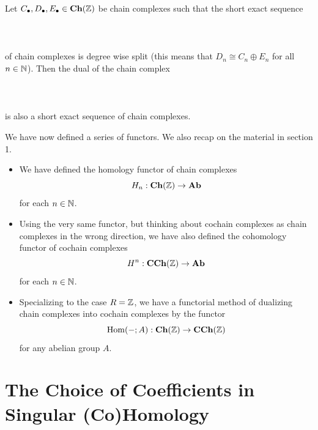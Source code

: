 \documentclass[a4paper]{article}
\begin{document}
\begin{prp}{}{} Let $C_\bullet,D_\bullet,E_\bullet\in\bold{Ch}(\mathbb{Z})$ be chain complexes such that the short exact sequence \\~\\
\\~\\
of chain complexes is degree wise split (this means that $D_n\cong C_n\oplus E_n$ for all $n\in\mathbb{N}$). Then the dual of the chain complex \\~\\
\\~\\
is also a short exact sequence of chain complexes. 
\end{prp}

We have now defined a series of functors. We also recap on the material in section 1. 
\begin{itemize}
\item We have defined the homology functor of chain complexes $$H_n:\bold{Ch}(\mathbb{Z})\to\bold{Ab}$$ for each $n\in\mathbb{N}$. 
\item Using the very same functor, but thinking about cochain complexes as chain complexes in the wrong direction, we have also defined the cohomology functor of cochain complexes $$H^n:\bold{CCh}(\mathbb{Z})\to\bold{Ab}$$ for each $n\in\mathbb{N}$. 
\item Specializing to the case $R=\mathbb{Z}$, we have a functorial method of dualizing chain complexes into cochain complexes by the functor $$\operatorname{Hom}(-;A):\bold{Ch}(\mathbb{Z})\to\bold{CCh}(\mathbb{Z})$$ for any abelian group $A$. 
\end{itemize}

\pagebreak
\section{The Choice of Coefficients in Singular (Co)Homology}
\end{document}
